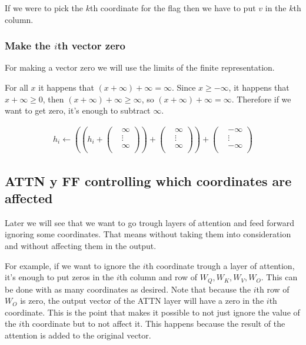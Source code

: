 If we were to pick the $k$th coordinate for the flag then we have to put $v$ in the $k$th column.

\subsubsection*{Make the $i$th vector zero}

For making a vector zero we will use the limits of the finite representation.

For all $x$ it happens that $(x + \infty) + \infty = \infty$. Since $x \ge -\infty$, it happens that $x + \infty \ge 0$, then $(x + \infty) + \infty \ge \infty$, so $(x + \infty) + \infty = \infty$. Therefore if we want to get zero, it's enough to subtract $\infty$.

\begin{align*}
    h_i \leftarrow \left(\left( h_i + 
    \left(\begin{matrix}
    &\infty \\
    &\vdots \\
    &\infty \\
\end{matrix}\right)\right)
    + \left(\begin{matrix}
    &\infty \\
    &\vdots \\
    &\infty \\
\end{matrix}\right)\right)
    + \left(\begin{matrix}
    &-\infty \\
    &\vdots \\
    &-\infty \\
\end{matrix}\right)
\end{align*}


\subsection*{ATTN y FF controlling which coordinates are affected}
Later we will see that we want to go trough layers of attention and feed forward ignoring some coordinates. That means without taking them into consideration and without affecting them in the output.

For example, if we want to ignore the $i$th coordinate trough a layer of attention, it's enough to put zeros in the $i$th column and row of $W_Q, W_K, W_V, W_O$. This can be done with as many coordinates as desired. Note that because the $i$th row of $W_O$ is zero, the output vector of the ATTN layer will have a zero in the $i$th coordinate. This is the point that makes it possible to not just ignore the value of the $i$th coordinate but to not affect it. This happens because the result of the attention is added to the original vector.

